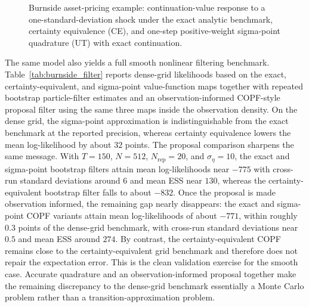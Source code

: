 \documentclass[11pt]{article}
\theoremstyle{remark}
\begin{document}
\begin{figure}[t]
\centering

\caption{Burnside asset-pricing example: continuation-value response to a one-standard-deviation shock under the exact analytic benchmark, certainty equivalence (CE), and one-step positive-weight sigma-point quadrature (UT) with exact continuation.}
\label{fig:burnside_irf}
\end{figure}

The same model also yields a full smooth nonlinear filtering benchmark.
Table~\ref{tab:burnside_filter} reports dense-grid likelihoods based on the exact, certainty-equivalent, and sigma-point value-function maps together with repeated bootstrap particle-filter estimates and an observation-informed COPF-style proposal filter using the same three maps inside the observation density.
On the dense grid, the sigma-point approximation is indistinguishable from the exact benchmark at the reported precision, whereas certainty equivalence lowers the mean log-likelihood by about $32$ points.
The proposal comparison sharpens the same message.
With $T=150$, $N=512$, $N_{\mathrm{rep}}=20$, and $\sigma_\eta=10$, the exact and sigma-point bootstrap filters attain mean log-likelihoods near $-775$ with cross-run standard deviations around $6$ and mean ESS near $130$, whereas the certainty-equivalent bootstrap filter falls to about $-832$.
Once the proposal is made observation informed, the remaining gap nearly disappears: the exact and sigma-point COPF variants attain mean log-likelihoods of about $-771$, within roughly $0.3$ points of the dense-grid benchmark, with cross-run standard deviations near $0.5$ and mean ESS around $274$.
By contrast, the certainty-equivalent COPF remains close to the certainty-equivalent grid benchmark and therefore does not repair the expectation error.
This is the clean validation exercise for the smooth case.
Accurate quadrature and an observation-informed proposal together make the remaining discrepancy to the dense-grid benchmark essentially a Monte Carlo problem rather than a transition-approximation problem.

\begin{table}[t]
\centering
\scriptsize
\setlength{\tabcolsep}{3pt}

\caption{Smooth Burnside filtering benchmark. The table reports mean log-likelihoods for dense-grid filters based on the exact, CE, and UT value-function maps, together with repeated bootstrap particle-filter and observation-informed COPF results using the same three measurement maps. The sample length is $T=150$, the particle count is $N=512$, the number of repeated runs is $N_{\mathrm{rep}}=20$, and the observation-noise standard deviation is $\sigma_\eta=10.0$. In this smooth nonlinear environment, the UT approximation matches the exact benchmark at the reported precision, while the observation-informed COPF all but eliminates the remaining bootstrap gap for the exact and UT maps.}
\label{tab:burnside_filter}
\end{table}
\end{document}
